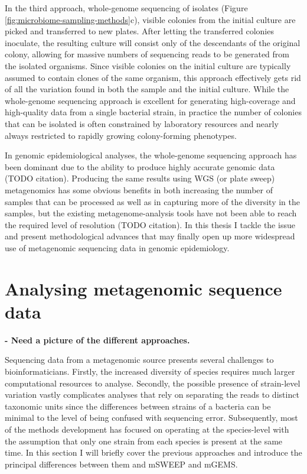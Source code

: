 \documentclass[officiallayout]{tktla}
\begin{document}
In the third approach, whole-genome sequencing of isolates (Figure
\ref{fig:microbiome-sampling-methods}c), visible colonies from the
initial culture are picked and transferred to new plates. After
letting the transferred colonies inoculate, the resulting culture will
consist only of the descendants of the original colony, allowing for
massive numbers of sequencing reads to be generated from the isolated
organisms. Since visible colonies on the initial culture are typically
assumed to contain clones of the same organism, this approach
effectively gets rid of all the variation found in both the sample and
the initial culture. While the whole-genome sequencing approach is
excellent for generating high-coverage and high-quality data from a
single bacterial strain, in practice the number of colonies that can
be isolated is often constrained by laboratory resources and nearly
always restricted to rapidly growing colony-forming phenotypes.

In genomic epidemiological analyses, the whole-genome sequencing
approach has been dominant due to the ability to produce highly
accurate genomic data (TODO citation). Producing the same results
using WGS (or plate sweep) metagenomics has some obvious benefits in
both increasing the number of samples that can be processed as well as
in capturing more of the diversity in the samples, but the existing
metagenome-analysis tools have not been able to reach the required
level of resolution (TODO citation). In this thesis I tackle the issue
and present methodological advances that may finally open up more
widespread use of metagenomic sequencing data in genomic epidemiology.

\section{Analysing metagenomic sequence data}

\textbf{- Need a picture of the different approaches.}

Sequencing data from a metagenomic source presents several challenges
to bioinformaticians. Firstly, the increased diversity of species
requires much larger computational resources to analyse. Secondly, the
possible presence of strain-level variation vastly complicates
analyses that rely on separating the reads to distinct taxonomic units
since the differences between strains of a bacteria can be minimal to
the level of being confused with sequencing error. Subsequently, most
of the methods development has focused on operating at the
species-level with the assumption that only one strain from each
species is present at the same time. In this section I will briefly
cover the previous approaches and introduce the principal differences
between them and mSWEEP and mGEMS.
\end{document}
